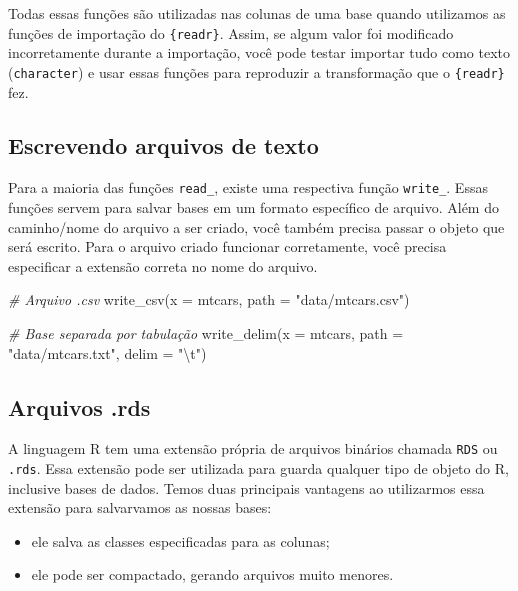 \documentclass[
]{book}
\newenvironment{Shaded}{\begin{snugshade}}{\end{snugshade}}
\newcommand{\AttributeTok}[1]{\textcolor[rgb]{0.77,0.63,0.00}{#1}}
\newcommand{\CommentTok}[1]{\textcolor[rgb]{0.56,0.35,0.01}{\textit{#1}}}
\newcommand{\FunctionTok}[1]{\textcolor[rgb]{0.00,0.00,0.00}{#1}}
\newcommand{\NormalTok}[1]{#1}
\newcommand{\SpecialCharTok}[1]{\textcolor[rgb]{0.00,0.00,0.00}{#1}}
\newcommand{\StringTok}[1]{\textcolor[rgb]{0.31,0.60,0.02}{#1}}
\begin{document}
Todas essas funções são utilizadas nas colunas de uma base quando utilizamos as funções de importação do \texttt{\{readr\}}. Assim, se algum valor foi modificado incorretamente durante a importação, você pode testar importar tudo como texto (\texttt{character}) e usar essas funções para reproduzir a transformação que o \texttt{\{readr\}} fez.

\hypertarget{escrevendo-arquivos-de-texto}{%
\subsection{Escrevendo arquivos de texto}\label{escrevendo-arquivos-de-texto}}

Para a maioria das funções \texttt{read\_}, existe uma respectiva função \texttt{write\_}. Essas funções servem para salvar bases em um formato específico de arquivo. Além do caminho/nome do arquivo a ser criado, você também precisa passar o objeto que será escrito. Para o arquivo criado funcionar corretamente, você precisa especificar a extensão correta no nome do arquivo.

\begin{Shaded}
\begin{Highlighting}[]
\CommentTok{\# Arquivo .csv}
\FunctionTok{write\_csv}\NormalTok{(}\AttributeTok{x =}\NormalTok{ mtcars, }\AttributeTok{path =} \StringTok{"data/mtcars.csv"}\NormalTok{)}

\CommentTok{\# Base separada por tabulação}
\FunctionTok{write\_delim}\NormalTok{(}\AttributeTok{x =}\NormalTok{ mtcars, }\AttributeTok{path =} \StringTok{"data/mtcars.txt"}\NormalTok{, }\AttributeTok{delim =} \StringTok{"}\SpecialCharTok{\textbackslash{}t}\StringTok{"}\NormalTok{)}
\end{Highlighting}
\end{Shaded}

\hypertarget{arquivos-.rds}{%
\subsection{Arquivos .rds}\label{arquivos-.rds}}

A linguagem R tem uma extensão própria de arquivos binários chamada \texttt{RDS} ou \texttt{.rds}. Essa extensão pode ser utilizada para guarda qualquer tipo de objeto do R, inclusive bases de dados. Temos duas principais vantagens ao utilizarmos essa extensão para salvarvamos as nossas bases:

\begin{itemize}
\item
  ele salva as classes especificadas para as colunas;
\item
  ele pode ser compactado, gerando arquivos muito menores.
\end{itemize}
\end{document}
